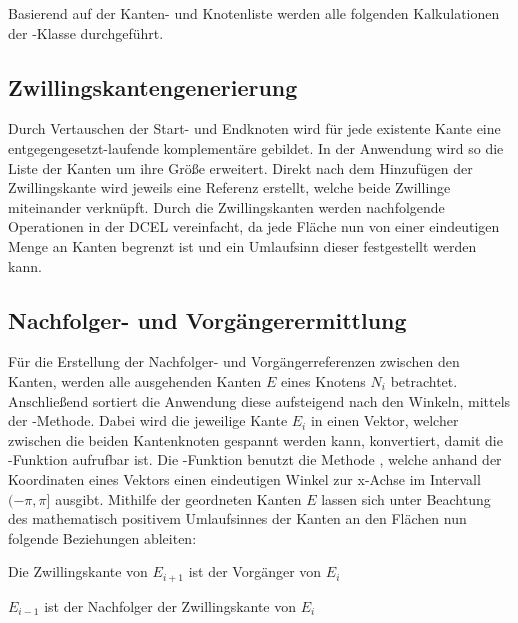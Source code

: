 Basierend auf der Kanten- und Knotenliste werden alle folgenden Kalkulationen der -Klasse durchgeführt.

\subsection{Zwillingskantengenerierung}
Durch Vertauschen der Start- und Endknoten wird für jede existente Kante eine entgegengesetzt-laufende komplementäre  gebildet.
In der Anwendung wird so die Liste der Kanten um ihre Größe erweitert.
Direkt nach dem Hinzufügen der Zwillingskante wird jeweils eine Referenz erstellt, welche beide Zwillinge miteinander verknüpft.
Durch die Zwillingskanten werden nachfolgende Operationen in der DCEL vereinfacht, da jede Fläche nun von einer eindeutigen Menge an Kanten begrenzt ist und ein Umlaufsinn dieser festgestellt werden kann.

\subsection{Nachfolger- und Vorgängerermittlung}
Für die Erstellung der Nachfolger- und Vorgängerreferenzen zwischen den Kanten, werden alle ausgehenden Kanten $E$ eines Knotens $N_i$ betrachtet.
Anschließend sortiert die Anwendung diese aufsteigend nach den Winkeln, mittels der -Methode.
Dabei wird die jeweilige Kante $E_i$ in einen Vektor, welcher zwischen die beiden Kantenknoten gespannt werden kann, konvertiert, damit die -Funktion aufrufbar ist.
Die -Funktion benutzt die Methode , welche anhand der Koordinaten eines Vektors einen eindeutigen Winkel zur x-Achse im Intervall $(-\pi,\pi]$ ausgibt.
Mithilfe der geordneten Kanten $E$ lassen sich unter Beachtung des mathematisch positivem Umlaufsinnes der Kanten an den Flächen nun folgende Beziehungen ableiten:

\begin{compactenum}
	\item Die Zwillingskante von $E_{i+1}$ ist der Vorgänger von $E_i$
	\item $E_{i-1}$ ist der Nachfolger der Zwillingskante von $E_i$ 
\end{compactenum}


